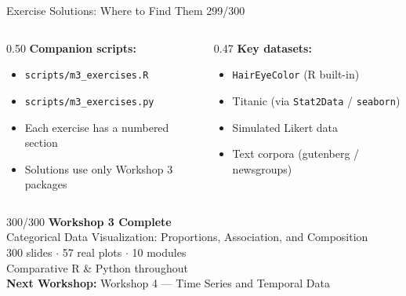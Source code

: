 \documentclass[10pt]{beamer}
\newcommand{\smark}[1]{\hfill{\scriptsize\color{codegray}#1}}
\begin{document}
\begin{frame}{Exercise Solutions: Where to Find Them}
\smark{299/300}
\begin{columns}[T]
\begin{column}{0.50\textwidth}
    \textbf{Companion scripts:}
    \begin{itemize}
        \item \texttt{scripts/m3\_exercises.R}
        \item \texttt{scripts/m3\_exercises.py}
        \item Each exercise has a numbered section
        \item Solutions use only Workshop 3 packages
    \end{itemize}
\end{column}
\begin{column}{0.47\textwidth}
    \textbf{Key datasets:}
    \begin{itemize}
        \item \texttt{HairEyeColor} (R built-in)
        \item Titanic (via \texttt{Stat2Data} / \texttt{seaborn})
        \item Simulated Likert data
        \item Text corpora (gutenberg / newsgroups)
    \end{itemize}
\end{column}
\end{columns}
\end{frame}

\begin{frame}{}\smark{300/300}
\centering\vspace{1.5cm}
{\Huge\textbf{Workshop 3 Complete}}\\[0.8cm]
{\Large Categorical Data Visualization: Proportions, Association, and Composition}\\[0.5cm]
300 slides $\cdot$ 57 real plots $\cdot$ 10 modules\\[0.3cm]
Comparative R \& Python throughout\\[0.8cm]
\textbf{Next Workshop:} Workshop 4 --- Time Series and Temporal Data
\end{frame}
\end{document}
